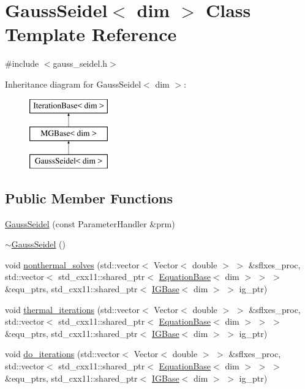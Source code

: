 \hypertarget{class_gauss_seidel}{}\section{Gauss\+Seidel$<$ dim $>$ Class Template Reference}
\label{class_gauss_seidel}


{\ttfamily \#include $<$gauss\+\_\+seidel.\+h$>$}

Inheritance diagram for Gauss\+Seidel$<$ dim $>$\+:\begin{figure}[H]
\begin{center}
\leavevmode
\includegraphics[height=3.000000cm]{class_gauss_seidel}
\end{center}
\end{figure}
\subsection*{Public Member Functions}
\begin{DoxyCompactItemize}
\item 
\hyperlink{class_gauss_seidel_a6024b3a7447aa8fb1cd0bd513c1af81e}{Gauss\+Seidel} (const Parameter\+Handler \&prm)
\item 
\hyperlink{class_gauss_seidel_a4d41231183512ec5aab1fa7088c60788}{$\sim$\+Gauss\+Seidel} ()
\item 
void \hyperlink{class_gauss_seidel_a28fc4ef9150773f587f90951c704c994}{nonthermal\+\_\+solves} (std\+::vector$<$ Vector$<$ double $>$ $>$ \&sflxes\+\_\+proc, std\+::vector$<$ std\+\_\+cxx11\+::shared\+\_\+ptr$<$ \hyperlink{class_equation_base}{Equation\+Base}$<$ dim $>$ $>$ $>$ \&equ\+\_\+ptrs, std\+\_\+cxx11\+::shared\+\_\+ptr$<$ \hyperlink{class_i_g_base}{I\+G\+Base}$<$ dim $>$ $>$ ig\+\_\+ptr)
\item 
void \hyperlink{class_gauss_seidel_a8db6abbdc88413cbf502ac606b415733}{thermal\+\_\+iterations} (std\+::vector$<$ Vector$<$ double $>$ $>$ \&sflxes\+\_\+proc, std\+::vector$<$ std\+\_\+cxx11\+::shared\+\_\+ptr$<$ \hyperlink{class_equation_base}{Equation\+Base}$<$ dim $>$ $>$ $>$ \&equ\+\_\+ptrs, std\+\_\+cxx11\+::shared\+\_\+ptr$<$ \hyperlink{class_i_g_base}{I\+G\+Base}$<$ dim $>$ $>$ ig\+\_\+ptr)
\item 
void \hyperlink{class_gauss_seidel_a24619a31b8a3d787bdc98e33a13f0ba6}{do\+\_\+iterations} (std\+::vector$<$ Vector$<$ double $>$ $>$ \&sflxes\+\_\+proc, std\+::vector$<$ std\+\_\+cxx11\+::shared\+\_\+ptr$<$ \hyperlink{class_equation_base}{Equation\+Base}$<$ dim $>$ $>$ $>$ \&equ\+\_\+ptrs, std\+\_\+cxx11\+::shared\+\_\+ptr$<$ \hyperlink{class_i_g_base}{I\+G\+Base}$<$ dim $>$ $>$ ig\+\_\+ptr)
\end{DoxyCompactItemize}
